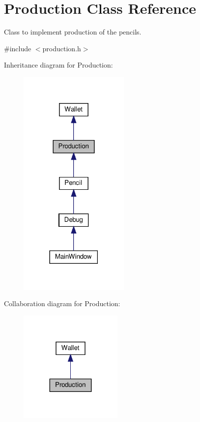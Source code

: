 \hypertarget{classProduction}{}\section{Production Class Reference}
\label{classProduction}


Class to implement production of the pencils.  




{\ttfamily \#include $<$production.\+h$>$}



Inheritance diagram for Production\+:
\nopagebreak
\begin{figure}[H]
\begin{center}
\leavevmode
\includegraphics[width=153pt]{classProduction__inherit__graph}
\end{center}
\end{figure}


Collaboration diagram for Production\+:
\nopagebreak
\begin{figure}[H]
\begin{center}
\leavevmode
\includegraphics[width=143pt]{classProduction__coll__graph}
\end{center}
\end{figure}
